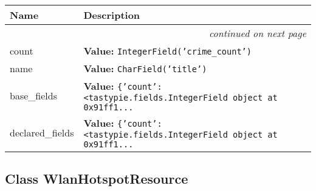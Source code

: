     \vspace{-1cm}
\hspace{\varindent}\begin{longtable}{|p{\varnamewidth}|p{\vardescrwidth}|l}
\cline{1-2}
\cline{1-2} \centering \textbf{Name} & \centering \textbf{Description}& \\
\cline{1-2}
\endhead\cline{1-2}\multicolumn{3}{r}{\small\textit{continued on next page}}\\\endfoot\cline{1-2}
\endlastfoot\raggedright c\-o\-u\-n\-t\- & \raggedright \textbf{Value:} 
{\tt IntegerField('crime\_count')}&\\
\cline{1-2}
\raggedright n\-a\-m\-e\- & \raggedright \textbf{Value:} 
{\tt CharField('title')}&\\
\cline{1-2}
\raggedright b\-a\-s\-e\-\_\-f\-i\-e\-l\-d\-s\- & \raggedright \textbf{Value:} 
{\tt \texttt{\{}\texttt{'}\texttt{count}\texttt{'}\texttt{: }{\textless}tastypie.fields.IntegerField object at 0x91ff1\texttt{...}}&\\
\cline{1-2}
\raggedright d\-e\-c\-l\-a\-r\-e\-d\-\_\-f\-i\-e\-l\-d\-s\- & \raggedright \textbf{Value:} 
{\tt \texttt{\{}\texttt{'}\texttt{count}\texttt{'}\texttt{: }{\textless}tastypie.fields.IntegerField object at 0x91ff1\texttt{...}}&\\
\cline{1-2}
\end{longtable}



\subsection{Class WlanHotspotResource}

